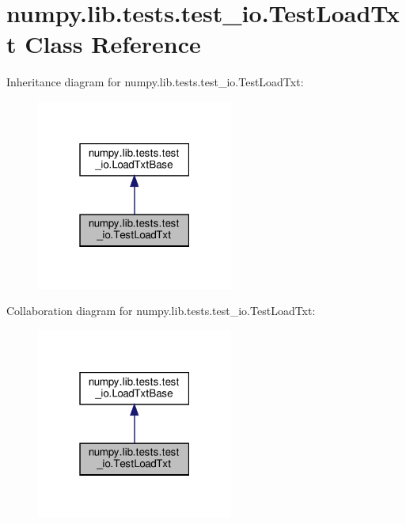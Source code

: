 \hypertarget{classnumpy_1_1lib_1_1tests_1_1test__io_1_1TestLoadTxt}{}\section{numpy.\+lib.\+tests.\+test\+\_\+io.\+Test\+Load\+Txt Class Reference}
\label{classnumpy_1_1lib_1_1tests_1_1test__io_1_1TestLoadTxt}


Inheritance diagram for numpy.\+lib.\+tests.\+test\+\_\+io.\+Test\+Load\+Txt\+:
\nopagebreak
\begin{figure}[H]
\begin{center}
\leavevmode
\includegraphics[width=183pt]{classnumpy_1_1lib_1_1tests_1_1test__io_1_1TestLoadTxt__inherit__graph}
\end{center}
\end{figure}


Collaboration diagram for numpy.\+lib.\+tests.\+test\+\_\+io.\+Test\+Load\+Txt\+:
\nopagebreak
\begin{figure}[H]
\begin{center}
\leavevmode
\includegraphics[width=183pt]{classnumpy_1_1lib_1_1tests_1_1test__io_1_1TestLoadTxt__coll__graph}
\end{center}
\end{figure}

